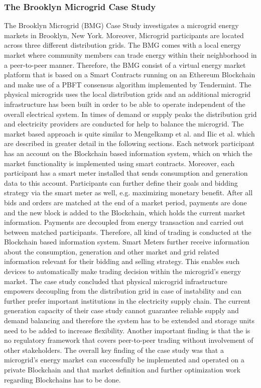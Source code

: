 \documentclass[runningheads]{llncs}
\begin{document}
\subsubsection{The Brooklyn Microgrid Case Study} 
The Brooklyn Microgrid (BMG) Case Study investigates a microgrid energy markets in Brooklyn, New York. Moreover, Microgrid participants are located across three different distribution grids. The BMG comes with a local energy market where community members can trade energy within their neighborhood in a peer-to-peer manner. \newline
Therefore, the BMG consist of a virtual energy market platform that is based on a Smart Contracts running on an Ethereum Blockchain and make use of a PBFT consensus algorithm implemented by Tendermint. The physical microgrids uses the local distribution grids and an additional microgrid infrastructure has been built in order to be able to operate independent of the overall electrical system. In times of demand or supply peaks the distribution grid and electricity providers are conducted for help to balance the microgrid. \cite{brooklyn_microgrid} \newline
The market based approach is quite similar to Mengelkamp et al. \cite{mengelkamp_lem} and Ilic et al. \cite{ilic_smart_grid_neighbourhoods} which are described in greater detail in the following sections. Each network participant has an account on the Blockchain based information system, which on which the market functionality is implemented using smart contracts. Moreover, each participant has a smart meter installed that sends consumption and generation data to this account. Participants can further define their goals and bidding strategy via the smart meter as well, e.g. maximizing monetary benefit. After all bids and orders are matched at the end of a market period, payments are done and the new block is added to the Blockchain, which holds the current market information. Payments are decoupled from energy transaction and carried out between matched participants. Therefore, all kind of trading is conducted at the Blockchain based information system. Smart Meters further receive information about the consumption, generation and other market and grid related information relevant for their bidding and selling strategy. This enables such devices to automatically make trading decision within the microgrid’s energy market. \newline
The case study \cite{brooklyn_microgrid} concluded that physical microgrid infrastructure empowers decoupling from the distribution grid in case of instability and can further prefer important institutions in the electricity supply chain. The current generation capacity of their case study cannot guarantee reliable supply and demand balancing and therefore the system has to be extended and storage units need to be added to increase flexibility. Another important finding is that the is no regulatory framework that covers peer-to-peer trading without involvement of other stakeholders. The overall key finding of the case study was that a microgrid’s energy market can successfully be implemented and operated on a private Blockchain and that market definition and further optimization work regarding Blockchains has to be done.
\end{document}
